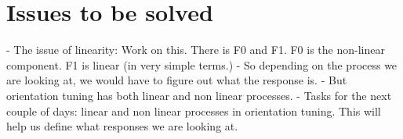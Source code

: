 \chapter{Issues to be solved}
	
	- The issue of linearity: Work on this. There is F0 and F1. F0 is the non-linear component. F1 is linear (in very simple terms.)
	- So depending on the process we are looking at, we would have to figure out what the response is.
	- But orientation tuning has both linear and non linear processes.
	- Tasks for the next couple of days: linear and non linear processes in orientation tuning. This will help us define what responses we are looking at.